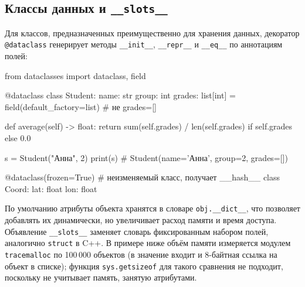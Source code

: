 \documentclass[11pt,a4paper]{article}
\newcommand{\code}[1]{\texttt{#1}}
\begin{document}
\subsection{Классы данных и \texttt{\_\_slots\_\_}}

Для классов, предназначенных преимущественно для хранения данных, декоратор \code{@dataclass}
генерирует методы \code{\_\_init\_\_}, \code{\_\_repr\_\_} и \code{\_\_eq\_\_} по аннотациям полей:

\begin{py}
from dataclasses import dataclass, field

@dataclass
class Student:
    name: str
    group: int
    grades: list[int] = field(default_factory=list)    # не grades=[]

    def average(self) -> float:
        return sum(self.grades) / len(self.grades) if self.grades else 0.0


s = Student("Анна", 2)
print(s)        # Student(name='Анна', group=2, grades=[])

@dataclass(frozen=True)         # неизменяемый класс, получает __hash__
class Coord:
    lat: float
    lon: float
\end{py}

По умолчанию атрибуты объекта хранятся в словаре \code{obj.\_\_dict\_\_}, что позволяет
добавлять их динамически, но увеличивает расход памяти и время доступа. Объявление
\code{\_\_slots\_\_} заменяет словарь фиксированным набором полей, аналогично \code{struct} в C++.
В примере ниже объём памяти измеряется модулем \code{tracemalloc} по 100\,000 объектов
(в значение входит и 8-байтная ссылка на объект в списке); функция \code{sys.getsizeof}
для такого сравнения не подходит, поскольку не учитывает память, занятую атрибутами.
\end{document}
